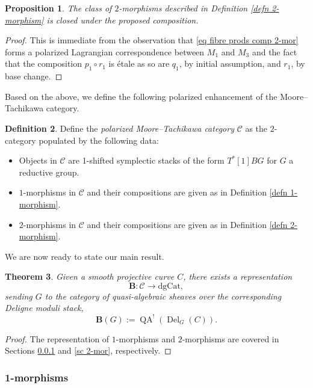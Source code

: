 \documentclass[11pt, a4paper]{amsart}
\numberwithin{equation}{section}
\newtheorem{theorem}{Theorem}[section]
\newtheorem{proposition}[theorem]{Proposition}
\theoremstyle{definition}
\newtheorem{definition}[theorem]{Definition}
\theoremstyle{remark}
\DeclareMathOperator{\Del}{Del}
\DeclareMathOperator{\QA}{QA}
\newcommand{\Cc}{\mathcal{C}}
\newcommand{\bB}{\mathbf{B}}
\renewcommand{\to}{\longrightarrow}
\begin{document}
\begin{proposition}
The class of $2$-morphisms described in Definition \ref{defn 2-morphism} is closed under the proposed composition.
\end{proposition}

\begin{proof}
This is immediate from the observation that \eqref{eq fibre prods comp 2-mor} forms a polarized Lagrangian correspondence \cite{Safronov} between $M_1$ and $M_3$ and the fact that the composition $p_1 \circ r_1$ is \'etale as so are $q_1$, by initial assumption, and $r_1$, by base change.
\end{proof}



Based on the above, we define the following polarized enhancement of the Moore--Tachikawa category.

\begin{definition}
Define the {\it polarized Moore--Tachikawa category} $\Cc$ as the $2$-category populated by the following data:
\begin{itemize}
    \item Objects in $\Cc$ are 1-shifted symplectic stacks of the form $T^*[1]BG$ for $G$ a reductive group.
    \item $1$-morphisms in $\Cc$ and their compositions are given as in Definition \ref{defn 1-morphism}.
    \item $2$-morphisms in $\Cc$ and their compositions are given as in Definition \ref{defn 2-morphism}.
\end{itemize}
\end{definition}

We are now ready to state our main result.

\begin{theorem} \label{th representation of Cc}
Given a smooth projective curve $C$, there exists a representation 
\[
\bB : \Cc \to \mathrm{dgCat},
\]
sending $G$ to the category of quasi-algebraic sheaves over the corresponding Deligne moduli stack,
\[
\bB(G) := \QA^!(\Del_G(C)).
\]
\end{theorem}

\begin{proof} 
The representation of $1$-morphisms and $2$-morphisms are covered in Sections \ref{sc 1-mor} and \ref{sc 2-mor}, respectively.
\end{proof}

\subsubsection{1-morphisms}
\label{sc 1-mor}
\end{document}
